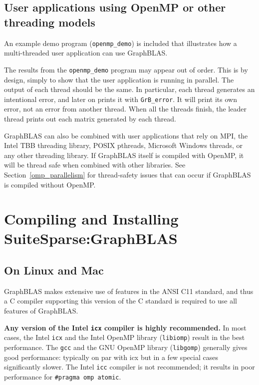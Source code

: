 \documentclass[12pt]{article}
\begin{document}
\subsection{User applications using OpenMP or other threading models}
\label{threads}

An example demo program (\verb'openmp_demo') is included that illustrates how a
multi-threaded user application can use GraphBLAS.

The results from the \verb'openmp_demo' program may appear out of order.  This
is by design, simply to show that the user application is running in parallel.
The output of each thread should be the same.  In particular, each thread
generates an intentional error, and later on prints it with \verb'GrB_error'.
It will print its own error, not an error from another thread.  When all the
threads finish, the leader thread prints out each matrix generated by each
thread.

GraphBLAS can also be combined with user applications that rely on MPI, the
Intel TBB threading library, POSIX pthreads, Microsoft Windows threads, or any
other threading library.  If GraphBLAS itself is compiled with OpenMP,
it will be thread safe when combined with other libraries.
See Section~\ref{omp_parallelism} for thread-safety issues that can occur
if GraphBLAS is compiled without OpenMP.

\newpage
\section{Compiling and Installing SuiteSparse:GraphBLAS}
\label{sec:install}

\subsection{On Linux and Mac}

GraphBLAS makes extensive use of features in the ANSI C11 standard, and thus a
C compiler supporting this version of the C standard is required to use
all features of GraphBLAS. 

{\bf Any version of the Intel \verb'icx' compiler is highly recommended.} In
most cases, the Intel \verb'icx' and the Intel OpenMP library (\verb'libiomp')
result in the best performance.  The \verb'gcc' and the GNU OpenMP library
(\verb'libgomp') generally gives good performance: typically on par with icx
but in a few special cases significantly slower.  The Intel \verb'icc' compiler
is not recommended; it results in poor performance for
\verb'#pragma omp atomic'.
\end{document}
